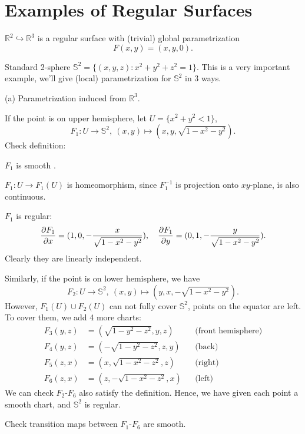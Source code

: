 \section{Examples of Regular Surfaces}

\begin{example}[1]
    \(\mathbb{R}^2\hookrightarrow\mathbb{R}^3\) is a regular surface with (trivial)
    global parametrization \[
        F(x,y)=(x,y,0)
    .\] 
\end{example}

\begin{example}[2]
    \label{charts on unit sphere}
    Standard 2-sphere \(\mathbb{S}^2=\{(x,y,z):x^2+y^2+z^2=1\}\). This is a very
    important example, we'll give (local) parametrization for \(\mathbb{S}^2\)
    in 3 ways.
\end{example}
\noindent (a) Parametrization induced from \(\mathbb{R}^3\).

If the point is on upper hemisphere, let \(U=\{x^2+y^2<1\}\), \[
    F_1\colon U\to \mathbb{S}^2,\ (x,y)\mapsto (x,y,\sqrt{1-x^2-y^2}).
\] Check definition:

\(F_1\) is smooth \checkmark{}. 

\(F_1\colon U\to F_1(U)\) is homeomorphism, since \(F_1^{-1}\) is
projection onto \(xy\)-plane, is also continuous.

\(F_1\) is regular: \[
    \pdv{F_1}{x}=(1,0,-\frac{x}{\sqrt{1-x^2-y^2}}),\quad
    \pdv{F_1}{y}=(0,1,-\frac{y}{\sqrt{1-x^2-y^2}})
.\] Clearly they are linearly independent.

Similarly, if the point is on lower hemisphere, we have \[
    F_2\colon U\to \mathbb{S}^2,\ (x,y)\mapsto (y,x,-\sqrt{1-x^2-y^2})
.\] However, \(F_1(U)\cup F_2(U)\) can not fully cover \(\mathbb{S}^2\), points on
the equator are left. To cover them, we add 4 more charts:
\begin{align*}
    F_3(y,z)&= (\sqrt{1-y^2-z^2},y,z) &&\text{(front hemisphere)} \\
    F_4(y,z)&= (-\sqrt{1-y^2-z^2},z,y) &&\text{(back)} \\
    F_5(z,x)&= (x,\sqrt{1-x^2-z^2},z) &&\text{(right)} \\
    F_6(z,x)&= (z,-\sqrt{1-x^2-z^2},x) &&\text{(left)}
\end{align*}
We can check \(F_2\)-\(F_6\) also satisfy the definition. Hence, we have given each
point a smooth chart, and \(\mathbb{S}^2\) is regular.
\begin{exercise}
    Check transition maps between \(F_1\)-\(F_6\) are smooth.
\end{exercise}

